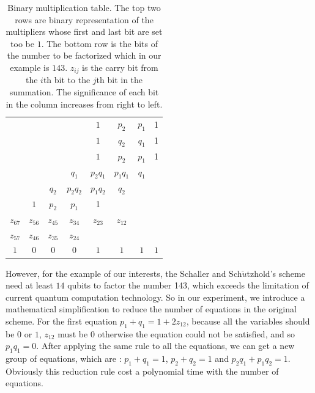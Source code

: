 \documentclass[twocolumn,showpacs,twoside,10pt,prl]{revtex4}
\begin{document}
\begin{table}[ht]
\begin{center}

\begin{tabular}{c|c|c|c|c|c|c|c}


\multicolumn{1}{c}{}

\ & \ & \ & \ & $1$ &  $p_2$  &  $p_1$  &  1  \\
\ & \ & \ & \ & $1$ & $q_2$  &  $q_1$  &  1  \\

\hline
\ & \ & \ & \ & $1$ &  $p_2$  &  $p_1$  &  1  \\
\ & \ & \ & $q_1$ &  $p_2 q_1$  &  $p_1 q_1$  &  $q_1$  & \ \\
\ & \ & $q_2$ &  $p_2q_2$  &  $p_1q_2$  &  $q_2$ & \ & \   \\
\ & $1$ &  $p_2$  &  $p_1$  &  1 & \ & \ & \   \\
\hline
$z_{67}$ & $z_{56}$ & $z_{45}$ &$z_{34}$ &$z_{23}$ &$z_{12}$ & \ &\ \\
$z_{57}$ & $z_{46}$ & $z_{35}$ &$z_{24}$ & \  & \ & \ &\ \\

\hline
$1$ & $0$ & $0$ & $0$ & $1$ & $1$ & $1$ & $1$ \\

\hline
\end{tabular}
\end{center}
\caption{Binary multiplication table. The top two rows are binary representation of
the multipliers whose first and last bit are set too be $1$.
The bottom row is the bits of the number to be factorized which in
our example is $143$. $z_{ij}$ is the carry bit from the $i$th bit
to the $j$th bit in the summation. The significance of each bit in
the column increases from right to left.} \label{bmt}
\end{table}

However, for the example of our interests, the Schaller and
Sch$\ddot{u}$tzhold's scheme\cite{Schaller}  need at least $14$ qubits to factor the
number 143, which exceeds the limitation of current quantum
computation technology. So in our experiment, we introduce
a mathematical simplification to reduce the number of equations in the original scheme.
For the first equation $p_1+q_1 = 1 + 2z_{12}$, because all the variables should be $0$ or $1$, $z_{12}$ must
be $0$ otherwise the equation could not be satisfied, and so $p_1q_1=0$. After applying the same rule to all the equations,
 we can get a new group of equations, which are : $p_1+q_1=1$, $p_2+q_2=1$ and $p_2q_1+p_1q_2=1$.
Obviously this reduction rule cost a polynomial time with the number of equations.
\end{document}
